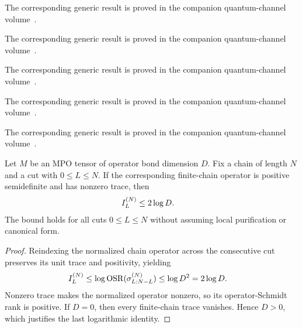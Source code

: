 The corresponding generic result is proved in the companion quantum-channel volume~\cite[``Total sandwiched R\'enyi trace'']{QICLean2026Blueprint}.



The corresponding generic result is proved in the companion quantum-channel volume~\cite[``Nonnegativity on the faithful domain'']{QICLean2026Blueprint}.



The corresponding generic result is proved in the companion quantum-channel volume~\cite[``Order-one sandwiched trace'']{QICLean2026Blueprint}.



The corresponding generic result is proved in the companion quantum-channel volume~\cite[``Order-two sandwiched trace'']{QICLean2026Blueprint}.



The corresponding generic result is proved in the companion quantum-channel volume~\cite[``Mutual information from operator-Schmidt rank'']{QICLean2026Blueprint}.


\begin{lemma}
    \label{thm:mpdo_finite_chain_mutual_information_two_log}
    \leanok
    Let $M$ be an MPO tensor of operator bond dimension $D$. Fix a chain of
    length $N$ and a cut with $0\leq L\leq N$. If the corresponding
    finite-chain operator is positive semidefinite and has nonzero trace, then
    \begin{align}
        I_L^{(N)} & \leq 2\log D.
        \notag
    \end{align}
    The bound holds for all cuts $0\leq L\leq N$ without assuming local
    purification or canonical form.
\end{lemma}

\begin{proof}\leanok
    Reindexing the normalized chain operator across the consecutive cut preserves
    its unit trace and positivity, yielding
    \begin{align}
        I_L^{(N)}
         & \leq \log\operatorname{OSR}(\sigma^{(N)}_{L:N-L})
        \leq \log D^2
        =2\log D.
        \notag
    \end{align}
    Nonzero trace makes the normalized operator nonzero, so its
    operator-Schmidt rank is positive. If $D=0$, then every finite-chain trace
    vanishes. Hence $D>0$, which justifies the last logarithmic identity.
\end{proof}

